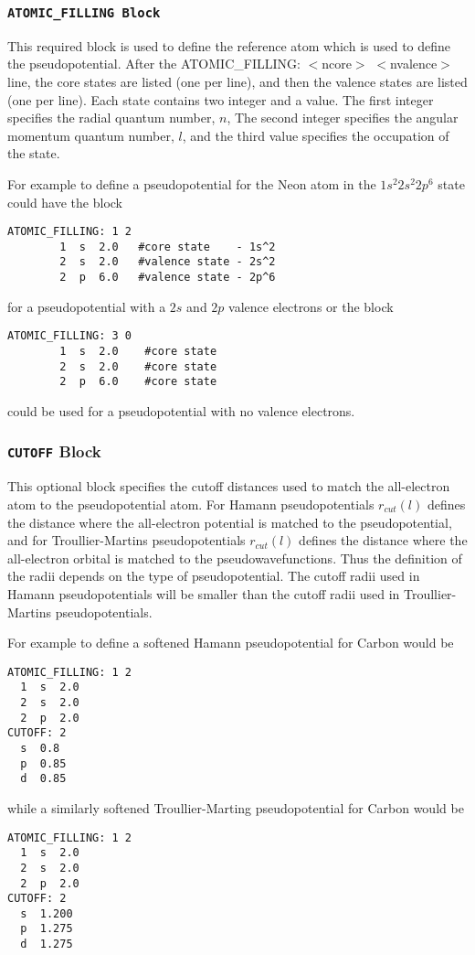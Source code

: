 \subsubsection{\tt ATOMIC\_FILLING Block}
This required block is used to define the reference atom which is used
to define the pseudopotential. After the ATOMIC\_FILLING: $<$ncore$>$
$<$nvalence$>$ line, the core states are listed (one per line), and
then the valence states are listed (one per line). 
Each state contains two integer and a value.  The first integer
specifies the radial quantum number, $n$,
The second integer specifies the angular momentum quantum number, $l$,
and the third value specifies the occupation of the state.

For example to define a pseudopotential
for the Neon atom in the $1s^2 2s^2 2p^6$ state
could have the block
\begin{verbatim}
ATOMIC_FILLING: 1 2
        1  s  2.0   #core state    - 1s^2 
        2  s  2.0   #valence state - 2s^2
        2  p  6.0   #valence state - 2p^6
\end{verbatim}
for a pseudopotential with a $2s$ and $2p$ valence electrons
or the block
\begin{verbatim}
ATOMIC_FILLING: 3 0
        1  s  2.0    #core state
        2  s  2.0    #core state
        2  p  6.0    #core state
\end{verbatim}
could be used for a pseudopotential with no valence electrons.


\subsubsection{{\tt CUTOFF} Block}
This optional block specifies the cutoff distances used
to match the all-electron atom to the pseudopotential atom.  For
Hamann pseudopotentials $r_{cut}(l)$ defines the distance
where the all-electron potential is matched to the pseudopotential, and
for Troullier-Martins pseudopotentials $r_{cut}(l)$ defines the distance
where the all-electron orbital is matched to the pseudowavefunctions. 
Thus the definition of the radii depends on the type of pseudopotential.  
The cutoff radii used in Hamann pseudopotentials will be smaller than
the cutoff radii used in Troullier-Martins pseudopotentials.  

For example to define a softened Hamann pseudopotential for
Carbon would be
\begin{verbatim}
ATOMIC_FILLING: 1 2
  1  s  2.0
  2  s  2.0
  2  p  2.0
CUTOFF: 2
  s  0.8
  p  0.85
  d  0.85
\end{verbatim}
while a similarly softened Troullier-Marting pseudopotential
for Carbon would be
\begin{verbatim}
ATOMIC_FILLING: 1 2
  1  s  2.0
  2  s  2.0
  2  p  2.0
CUTOFF: 2
  s  1.200
  p  1.275
  d  1.275
\end{verbatim}


